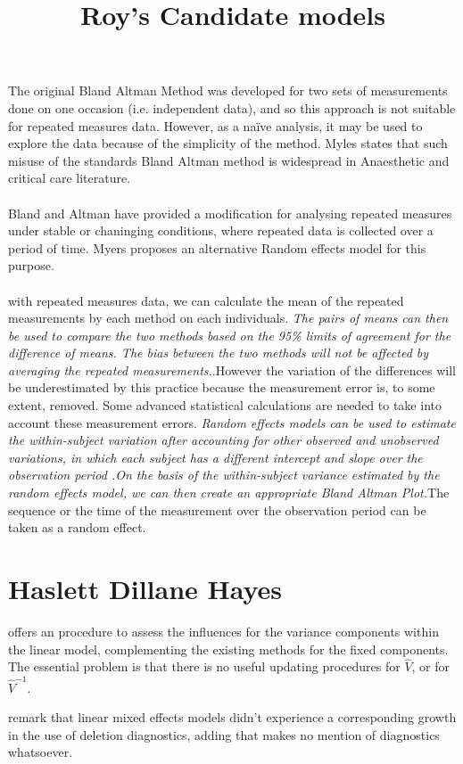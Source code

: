 \documentclass[12pt, a4paper]{report}
\theoremstyle{plain}
\theoremstyle{definition}
\theoremstyle{remark}
\begin{document}
\title{Roy's Candidate models}
The original Bland Altman Method was developed for two sets of
measurements done on one occasion (i.e. independent data), and so
this approach is not suitable for repeated measures data. However,
as a naïve analysis, it may be used to explore the data because of
the simplicity of the method. Myles states that such misuse of the
standards Bland Altman method is widespread in Anaesthetic and
critical care literature.
\\
\\
Bland and Altman have provided a modification for analysing
repeated measures under stable or chaninging conditions, where
repeated data is collected over a period of time. Myers proposes
an alternative Random effects model for this purpose.
\\
\\
with repeated measures data, we can
calculate the mean of the repeated measurements by each method on
each individuals. \emph{ The pairs of means can then be used to
	compare the two methods based on the 95\% limits of agreement for
	the difference of means. The bias between the two methods will not
	be affected by averaging the repeated measurements.}.However the
variation of the differences will be underestimated by this
practice because the measurement error is, to some extent,
removed. Some advanced statistical calculations are needed to take
into account these measurement errors. \emph{Random effects models
	can be used to estimate the within-subject variation after
	accounting for other observed and unobserved variations, in which
	each subject has a different intercept and slope over the
	observation period .On the basis of the within-subject variance
	estimated by the random effects model, we can then create an
	appropriate Bland Altman Plot.}The sequence or the time of the
measurement over the observation period can be taken as a random
effect.


\section{Haslett Dillane Hayes}
	\citet{HaslettDillane} offers an procedure to assess the influences for the variance components
	within the linear model, complementing the existing methods for the fixed components. The essential problem is that there is no useful updating procedures for $\hat{V}$, or for $\hat{V}^{-1}$.
	
	\citet{HaslettDillane} remark that linear mixed effects models
	didn't experience a corresponding growth in the use of deletion
	diagnostics, adding that \citet{McCullSearle} makes no mention of
	diagnostics whatsoever.	
	
\end{document}
